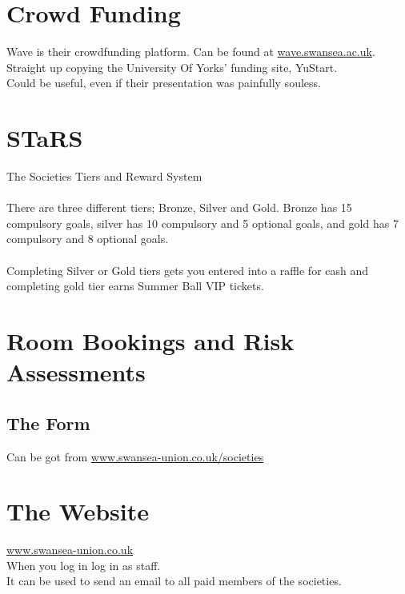 \documentclass[12pt,a4paper]{article}
\begin{document}
\section{Crowd Funding}
	Wave is their crowdfunding platform. Can be found at \url{wave.swansea.ac.uk}. Straight up copying the University Of Yorks' funding site, YuStart. 
	\\ Could be useful, even if their presentation was painfully souless.
	
\section{STaRS}
	The Societies Tiers and Reward System \\
	\\
	There are three different tiers; Bronze, Silver and Gold. Bronze has 15 compulsory goals, silver has 10 compulsory and 5 optional goals, and gold has 7 compulsory and 8 optional goals. \\
	\\
	Completing Silver or Gold tiers gets you entered into a raffle for cash and completing gold tier earns Summer Ball VIP tickets. 
	
\section{Room Bookings and Risk Assessments}
	\subsection{The Form}	
		Can be got from \url{www.swansea-union.co.uk/societies}
		
\section{The Website}
	\url{www.swansea-union.co.uk} \\
	When you log in log in as staff. \\ 
	It can be used to send an email to all paid members of the societies.
\end{document}

